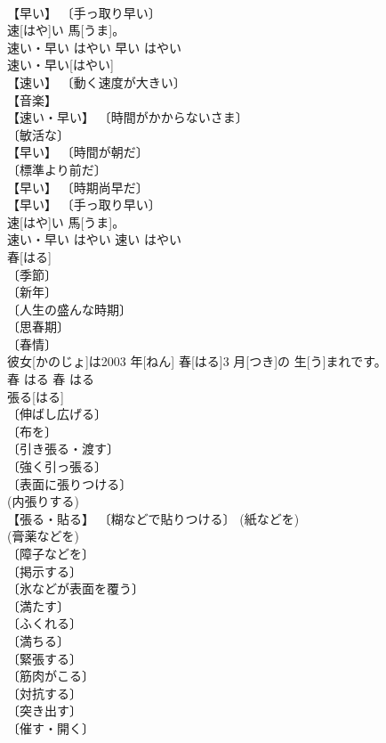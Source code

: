\documentclass[8pt]{extreport}
\begin{document}
\begin{CJK}{UTF8}{min}
\\	【早い】 〔手っ取り早い〕 
\\	速[はや]い 馬[うま]。	
\\	速い・早い	はやい	早い	はやい	
\\	速い・早い[はやい]	
\\	【速い】 〔動く速度が大きい〕 
\\	【音楽】 
\\	【速い・早い】 〔時間がかからないさま〕 
\\	〔敏活な〕 
\\	【早い】 〔時間が朝だ〕 
\\	〔標準より前だ〕 
\\	【早い】 〔時期尚早だ〕 
\\	【早い】 〔手っ取り早い〕 
\\	速[はや]い 馬[うま]。	
\\	速い・早い	はやい	速い	はやい	
\\	春[はる]	
\\	〔季節〕 
\\	〔新年〕 
\\	〔人生の盛んな時期〕 
\\	〔思春期〕 
\\	〔春情〕 
\\	彼女[かのじょ]は2003 年[ねん] 春[はる]3 月[つき]の 生[う]まれです。	
\\	春	はる	春	はる	
\\	張る[はる]	
\\	〔伸ばし広げる〕 
\\	〔布を〕 
\\	〔引き張る・渡す〕 
\\	〔強く引っ張る〕 
\\	〔表面に張りつける〕 
\\	(内張りする) 
\\	【張る・貼る】 〔糊などで貼りつける〕 (紙などを) 
\\	(膏薬などを) 
\\	〔障子などを〕 
\\	〔掲示する〕 
\\	〔氷などが表面を覆う〕 
\\	〔満たす〕 
\\	〔ふくれる〕 
\\	〔満ちる〕 
\\	〔緊張する〕 
\\	〔筋肉がこる〕 
\\	〔対抗する〕 
\\	〔突き出す〕 
\\	〔催す・開く〕 

\end{CJK}
\end{document}

